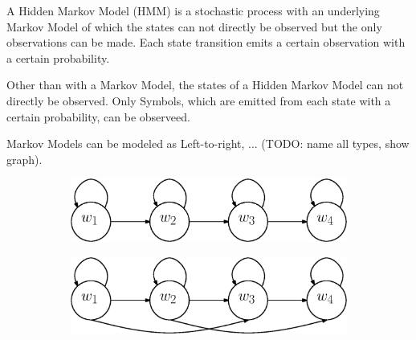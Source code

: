 \documentclass[a4paper, oneside]{csthesis}
\begin{document}
A Hidden Markov Model (HMM) is a stochastic process with an underlying Markov Model of which the states can not directly be observed but the only observations can be made. Each state transition emits a certain observation with a certain probability.

Other than with a Markov Model, the states of a Hidden Markov Model can not directly be observed. Only Symbols, which are emitted from each state with a certain probability, can be observeed.



Markov Models can be modeled as Left-to-right, ... (TODO: name all types, show graph).


\begin{figure}
        \centering
        \begin{subfigure}[b]{0.45\textwidth}
                \centering
                \includegraphics[width=\textwidth]{figures/hmm-ltr1.eps}
                \label{fig:hmm1}
        \end{subfigure}%
        \quad
        \begin{subfigure}[b]{0.45\textwidth}
                \centering
                \includegraphics[width=\textwidth]{figures/hmm-ltr2.eps}
                \label{fig:hmm1}
        \end{subfigure}%


\end{figure}
\end{document}
